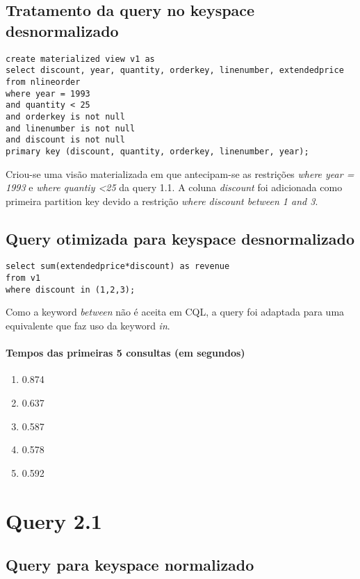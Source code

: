 \documentclass[12pt]{article}
\begin{document}
\subsection{Tratamento da query no keyspace desnormalizado}

\begin{lstlisting}
create materialized view v1 as 
select discount, year, quantity, orderkey, linenumber, extendedprice
from nlineorder
where year = 1993 
and quantity < 25
and orderkey is not null
and linenumber is not null
and discount is not null
primary key (discount, quantity, orderkey, linenumber, year);

\end{lstlisting}

Criou-se uma visão materializada em que antecipam-se as restrições \emph{where year = 1993} e \emph{where quantiy \textless 25} da query 1.1. A coluna \emph{discount} foi adicionada como primeira partition key devido a restrição \emph{where discount between 1 and 3}.

\subsection{Query otimizada para keyspace desnormalizado}

\begin{lstlisting}
select sum(extendedprice*discount) as revenue
from v1
where discount in (1,2,3);
\end{lstlisting}

Como a keyword \emph{between} não é aceita em CQL, a query foi adaptada para uma equivalente que faz uso da keyword \emph{in}.

\paragraph{Tempos das primeiras 5 consultas (em segundos)}
\begin{enumerate}
\item 0.874 
\item 0.637 
\item 0.587 
\item 0.578 
\item 0.592
\end{enumerate}

\section{Query 2.1}

\subsection{Query para keyspace normalizado}
\end{document}
